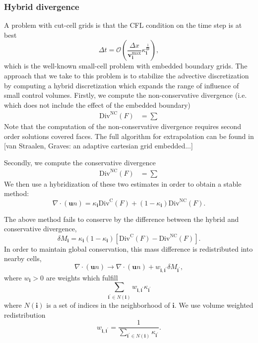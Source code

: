 \documentclass[3p]{elsarticle}
\def\bmi{\ensuremath{\bm{i}}}
\begin{document}
\subsubsection{Hybrid divergence}
\label{sec:hybrid}
A problem with cut-cell grids is that the CFL condition on the time step is at best
\begin{equation}
  \Delta t = \mathcal{O}\left(\frac{\Delta x}{\bm{v}_{\bmi}^{\text{max}}}\kappa_{\bmi}^{\frac{1}{\bm{D}}}\right),
\end{equation}
which is the well-known small-cell problem with embedded boundary grids. The approach that we take to this problem is to stabilize the advective discretization by computing a hybrid discretization which expands the range of influence of small control volumes. Firstly, we compute the non-conservative divergence (i.e. which does not include the effect of the embedded boundary)
\begin{equation}
  \begin{split}
    \text{Div}^{\text{NC}}(F) &= \sum
  \end{split}
\end{equation}
Note that the computation of the non-conservative divergence requires second order solutions covered faces. The full algorithm for extrapolation can be found in [van Straalen, Graves: an adaptive cartesian grid embedded...]

Secondly, we compute the conservative divergence
\begin{equation}
  \begin{split}
    \text{Div}^{\text{NC}}(F) &= \sum 
  \end{split}
\end{equation}
We then use a hybridization of these two estimates in order to obtain a stable method:
\begin{equation}
  \nabla\cdot\left(\bm{u} n\right) = \kappa_{\bmi}\text{Div}^{\text{C}}(F) + \left(1 - \kappa_{\bmi}\right)\text{Div}^{\text{NC}}(F).
\end{equation}

The above method fails to conserve by the difference between the hybrid and conservative divergence,
\begin{equation}
  \delta M_{\bmi} = \kappa_{\bmi}\left(1-\kappa_{\bmi}\right)\left[\text{Div}^{\text{C}}(F) -\text{Div}^{\text{NC}}(F)\right]. 
\end{equation}
In order to maintain global conservation, this mass difference is redistributed into nearby cells,
\begin{equation}
  \nabla\cdot\left(\bm{u} n\right) \rightarrow \nabla\cdot\left(\bm{u} n\right) + w_{\bmi, \bmi^\prime}\delta M_{\bmi^\prime},
\end{equation}
where $w_{\bmi} > 0$ are weights which fulfill
\begin{equation}
  \sum_{\bmi^\prime \in N(\bmi)}w_{\bmi, \bmi^\prime}\kappa_{\bmi^\prime}
\end{equation}
where $N(\bmi)$ is a set of indices in the neighborhood of $\bmi$. We use volume weighted redistribution
\begin{equation}
  w_{\bmi, \bmi^\prime} = \frac{1}{\displaystyle\sum_{\bmi^\prime \in N(\bmi)}\kappa_{\bmi^\prime}}.
\end{equation}
\end{document}
